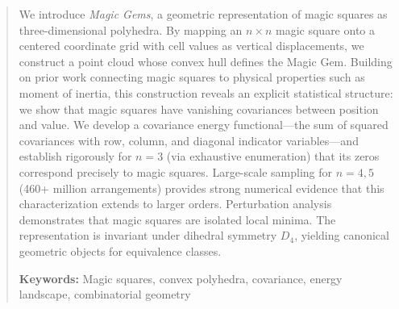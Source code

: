 \begin{abstract}
We introduce \emph{Magic Gems}, a geometric representation of magic squares as three-dimensional polyhedra. 
By mapping an $n \times n$ magic square onto a centered coordinate grid with cell values as vertical displacements, 
we construct a point cloud whose convex hull defines the Magic Gem.
Building on prior work connecting magic squares to physical properties such as moment of inertia,
this construction reveals an explicit statistical structure: 
we show that magic squares have vanishing covariances between position and value.
We develop a covariance energy functional---the sum of squared covariances with row, column, 
and diagonal indicator variables---and establish rigorously for $n=3$ (via exhaustive enumeration) 
that its zeros correspond precisely to magic squares.
Large-scale sampling for $n = 4,5$ (460+ million arrangements) provides strong numerical evidence 
that this characterization extends to larger orders.
Perturbation analysis demonstrates that magic squares are isolated local minima.
The representation is invariant under dihedral symmetry $D_4$, 
yielding canonical geometric objects for equivalence classes.

\medskip
\noindent\textbf{Keywords:} Magic squares, convex polyhedra, covariance, energy landscape, combinatorial geometry
\end{abstract}

